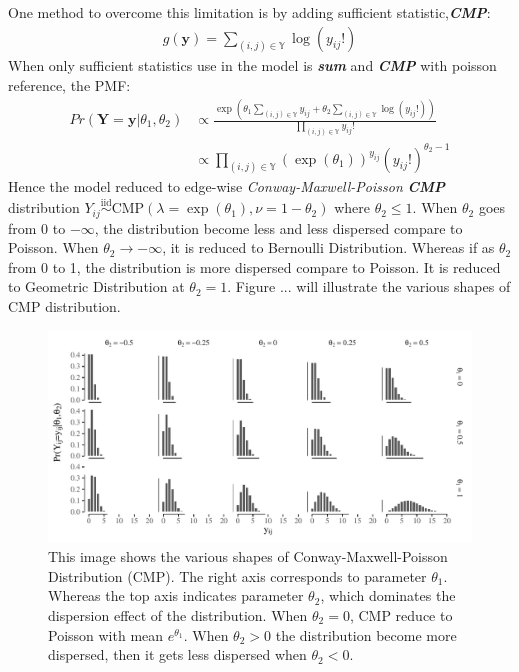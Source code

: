 \documentclass[12pt,a4paper,twoside,openany]{book}\usepackage[]{graphicx}\usepackage[]{color}
\makeatletter
\def\maxwidth{ %
  \ifdim\Gin@nat@width>\linewidth
    \linewidth
  \else
    \Gin@nat@width
  \fi
}
\newenvironment{knitrout}{}{} %
\makeatother
\begin{document}
One method to overcome this limitation is by adding sufficient statistic,\textit{\textbf{CMP}}:
\begin{align}
g(\bm{y}) = \sum_{(i,j) \in \mathbb{Y}} \log(y_{ij}!)
\end{align}
When only sufficient statistics use in the model is \textit{\textbf{sum}} and \textit{\textbf{CMP}} with poisson reference, the PMF:
\begin{align*}
Pr(\bm{Y}=\bm{y}|\theta_1,\theta_2) &\propto \frac{\exp\left(\theta_1 \sum_{(i,j) \in \mathbb{Y}} y_{ij} + \theta_2 \sum_{(i,j) \in \mathbb{Y}} \log(y_{ij}!)\right)}{\prod_{(i,j) \in \mathbb{Y}}y_{ij}!}\\
&\propto \prod_{(i,j) \in \mathbb{Y}} (\exp(\theta_1))^{y_{ij}} (y_{ij}!)^{\theta_2-1}
\end{align*}
Hence the model reduced to edge-wise \textit{Conway-Maxwell-Poisson} \textit{\textbf{CMP}} distribution $Y_{ij}\stackrel{\text{iid}}{\sim}\text{CMP}(\lambda =\exp(\theta_1),\nu = 1-\theta_2)$ where $\theta_2 \le 1$. When $\theta_2$ goes from 0 to $-\infty$, the distribution become less and less dispersed compare to Poisson. When $\theta_2 \to -\infty$, it is reduced to Bernoulli Distribution. Whereas if as $\theta_2$ from 0 to 1, the distribution is more dispersed compare to Poisson. It is reduced  to Geometric Distribution at $\theta_2=1$. Figure ... will illustrate the various shapes of CMP distribution.

\begin{figure}[H]
\begin{knitrout}
\color{fgcolor}

{\centering \includegraphics[width=\maxwidth]{figure/unnamed-chunk-3-1} 

}



\end{knitrout}
\caption ["Illustration of Conway-Maxwell-Poisson Distribution"]{This image shows the various shapes of Conway-Maxwell-Poisson Distribution (CMP). The right axis corresponds to parameter $\theta_1$. Whereas the top axis indicates parameter $\theta_2$, which dominates the dispersion effect of the distribution. When $\theta_2 = 0$, CMP reduce to Poisson with mean $e^{\theta_1}$. When $\theta_2 >0$ the distribution become more dispersed, then it gets less dispersed when $\theta_2<0$.}  
\end{figure}
\end{document}
